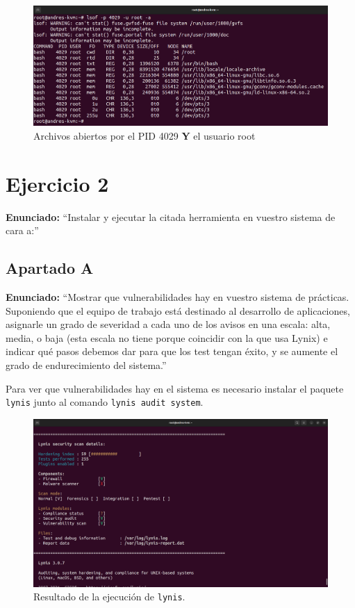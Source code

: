 \documentclass{article}
\begin{document}
\begin{figure}[H]
    \includegraphics[width=\textwidth]{imagenes/lsofand.png}
    \caption{Archivos abiertos por el PID 4029 \textbf{Y} el usuario root}
\end{figure}


\newpage

\section{Ejercicio 2}
\textbf{Enunciado: }``Instalar y ejecutar la citada herramienta en vuestro sistema de cara a:''

\subsection{Apartado A}
\textbf{Enunciado: }``Mostrar que vulnerabilidades hay en vuestro sistema de prácticas. Suponiendo que el equipo de trabajo está destinado al desarrollo de aplicaciones, asignarle un grado de severidad a cada uno de los avisos en una escala: alta, media, o baja (esta escala no tiene porque coincidir con la que usa Lynix) e indicar qué pasos debemos dar para que los test tengan éxito, y se aumente el grado de endurecimiento del sistema.''

\bigskip

Para ver que vulnerabilidades hay en el sistema es necesario instalar el paquete \verb|lynis| junto al comando \verb|lynis audit system|.

\begin{figure}[H]
    \includegraphics[width=\textwidth]{imagenes/lynisresults1.png}
    \caption{Resultado de la ejecución de \texttt{lynis}.}
\end{figure}
\end{document}
